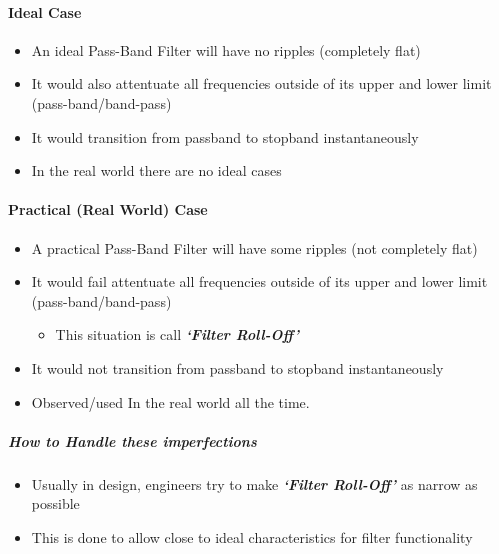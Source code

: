 \documentclass[11pt]{article}
\providecommand{\tightlist}{%
      \setlength{\itemsep}{0pt}\setlength{\parskip}{0pt}}
\begin{document}
\hypertarget{ideal-case}{%
\paragraph{Ideal Case}\label{ideal-case}}

\begin{itemize}
\tightlist
\item
  An ideal Pass-Band Filter will have no ripples (completely flat)
\item
  It would also attentuate all frequencies outside of its upper and
  lower limit (pass-band/band-pass)
\item
  It would transition from passband to stopband instantaneously
\item
  In the real world there are no ideal cases
\end{itemize}

\hypertarget{practical-real-world-case}{%
\paragraph{Practical (Real World)
Case}\label{practical-real-world-case}}

\begin{itemize}
\tightlist
\item
  A practical Pass-Band Filter will have some ripples (not completely
  flat)
\item
  It would fail attentuate all frequencies outside of its upper and
  lower limit (pass-band/band-pass)

  \begin{itemize}
  \tightlist
  \item
    This situation is call \textbf{\emph{`Filter Roll-Off'}}
  \end{itemize}
\item
  It would not transition from passband to stopband instantaneously
\item
  Observed/used In the real world all the time.
\end{itemize}

\hypertarget{how-to-handle-these-imperfections}{%
\subparagraph{How to Handle these
imperfections}\label{how-to-handle-these-imperfections}}

\begin{itemize}
\tightlist
\item
  Usually in design, engineers try to make \textbf{\emph{`Filter
  Roll-Off'}} as narrow as possible
\item
  This is done to allow close to ideal characteristics for filter
  functionality
\end{itemize}
\end{document}
